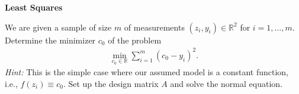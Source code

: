 \textbf{\normalsize Least Squares}

We are given a sample of size $m$ of measurements $(z_i,y_i)\in\mathbb{R}^2$ for $i=1,\dots,m$. 
Determine the minimizer $c_0$ of the problem
\begin{align*}
\min \limits_{c_0\in\mathbb{R}} \sum_{i=1}^m (c_0 - y_i)^2.
\end{align*}
\textit{Hint: } This is the simple case where our assumed model is a constant function, i.e., $f(z_i) \equiv c_0$. Set up the design matrix $A$ and solve the normal equation.

